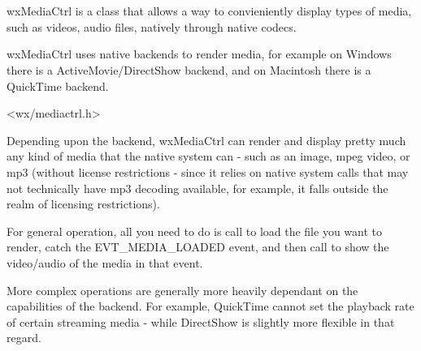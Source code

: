 
\section{}\label{wxmediactrl}

wxMediaCtrl is a class that allows a way to convieniently display types of 
media, such as videos, audio files, natively through native codecs.

wxMediaCtrl uses native backends to render media, for example on Windows
there is a ActiveMovie/DirectShow backend, and on Macintosh there is a 
QuickTime backend.






<wx/mediactrl.h>



\label{renderingmediawxmediactrl}

Depending upon the backend, wxMediaCtrl can render
and display pretty much any kind of media that the native system can - 
such as an image, mpeg video, or mp3 (without license restrictions -
since it relies on native system calls that may not technically
have mp3 decoding available, for example, it falls outside the
realm of licensing restrictions).

For general operation, all you need to do is call 
 to load the file
you want to render, catch the EVT\_MEDIA\_LOADED event,
and then call  
to show the video/audio of the media in that event.

More complex operations are generally more heavily dependant on the
capabilities of the backend.  For example, QuickTime cannot set
the playback rate of certain streaming media - while DirectShow is 
slightly more flexible in that regard.


